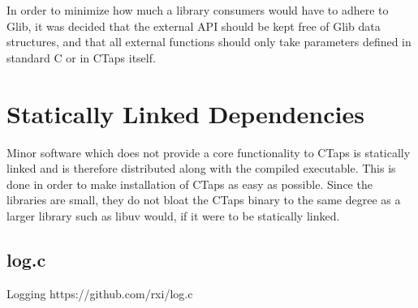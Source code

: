 In order to minimize how much a library consumers would have to
adhere to Glib, it was decided that the external API should be
kept free of Glib data structures, and that all external functions
should only take parameters defined in standard C or in CTaps itself.

\section{Statically Linked Dependencies}
Minor software which does not provide a core functionality to CTaps
is statically linked and is therefore distributed along with the
compiled executable. 
This is done in order to make installation of
CTaps as easy as possible. Since the libraries are small, they
do not bloat the CTaps binary to the same degree as a larger library
such as libuv would, if it were to be statically linked.

\subsection{log.c}
Logging
https://github.com/rxi/log.c

